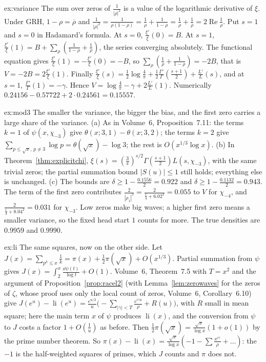 \begin{solution}{ex:variance}
\idea The sum over zeros of $\frac1{|\rho|^2}$ is a value of the logarithmic derivative of $\xi$.
\writeup Under GRH, $1-\rho=\overline\rho$ and $\frac1{|\rho|^2}=\frac1{\rho(1-\rho)}=\frac1\rho+\frac1{1-\rho}=\frac1\rho+\frac1{\overline\rho}=2\operatorname{Re}\frac1\rho$. Put $s=1$ and $s=0$ in Hadamard's formula. At $s=0$, $\frac{\xi'}\xi(0)=B$. At $s=1$, $\frac{\xi'}\xi(1)=B+\sum_\rho(\frac1{1-\rho}+\frac1\rho)$, the series converging absolutely. The functional equation gives $\frac{\xi'}\xi(1)=-\frac{\xi'}\xi(0)=-B$, so $\sum_\rho(\frac1\rho+\frac1{1-\rho})=-2B$, that is $V=-2B=2\frac{\xi'}\xi(1)$. Finally $\frac{\xi'}\xi(s)=\frac12\log\frac4\pi+\frac12\frac{\Gamma'}\Gamma(\frac{s+1}2)+\frac{L'}L(s)$, and at $s=1$, $\frac{\Gamma'}\Gamma(1)=-\gamma$. Hence $V=\log\frac4\pi-\gamma+2\frac{L'}L(1)$. Numerically $0.24156-0.57722+2\cdot0.24561=0.15557$.
\end{solution}

\begin{solution}{ex:mod3}
\idea The smaller the variance, the bigger the bias, and the first zero carries a large share of the variance.
\writeup (a) As in Volume~6, Proposition~7.11: the terms $k=1$ of $\psi(x,\chi_{-3})$ give $\theta(x;3,1)-\theta(x;3,2)$; the terms $k=2$ give $\sum_{p\le\sqrt x,\,p\ne3}\log p=\theta(\sqrt x)-\log3$; the rest is $O(x^{1/3}\log x)$. (b) In Theorem~\ref{thm:explicitchi}, $\xi(s)=(\frac3\pi)^{s/2}\Gamma(\frac{s+1}2)L(s,\chi_{-3})$, with the same trivial zeros; the partial summation bound $|S(u)|\le1$ still holds; everything else is unchanged. (c) The bounds are $\delta\ge1-\frac{0.1556}2=0.922$ and $\delta\ge1-\frac{0.1132}2=0.943$. The term of the first zero contributes $\frac2{|\rho_1|^2}=\frac2{\frac14+6.02^2}=0.055$ to $V$ for $\chi_{-4}$, and $\frac2{\frac14+8.04^2}=0.031$ for $\chi_{-3}$. Low zeros make big waves; a higher first zero means a smaller variance, so the fixed head start $1$ counts for more. The true densities are $0.9959$ and $0.9990$.
\end{solution}

\begin{solution}{ex:li}
\idea The same squares, now on the other side.
\writeup Let $J(x)=\sum_{p^k\le x}\frac1k=\pi(x)+\frac12\pi(\sqrt x)+O(x^{1/3})$. Partial summation from $\psi$ gives $J(x)=\int_2^x\frac{\dd\psi(t)}{\log t}+O(1)$. Volume~6, Theorem~7.5 with $T=x^2$ and the argument of Proposition~\ref{prop:racel2} (with Lemma~\ref{lem:zerowaves} for the zeros of $\zeta$, whose proof uses only the local count of zeros, Volume~6, Corollary~6.10) give $J(e^u)-\operatorname{li}(e^u)=\frac{e^{u/2}}u\bigl(-\sum_{|\gamma|<T}\frac{e^{i\gamma u}}\rho+R(u)\bigr)$, with $R$ small in mean square; here the main term $x$ of $\psi$ produces $\operatorname{li}(x)$, and the conversion from $\psi$ to $J$ costs a factor $1+O(\frac1u)$ as before. Then $\frac12\pi(\sqrt x)=\frac{\sqrt x}{\log x}(1+o(1))$ by the prime number theorem. So $\pi(x)-\operatorname{li}(x)=\frac{\sqrt x}{\log x}(-1-\sum\frac{x^{i\gamma}}\rho+\dots)$: the $-1$ is the half-weighted squares of primes, which $J$ counts and $\pi$ does not.
\end{solution}

